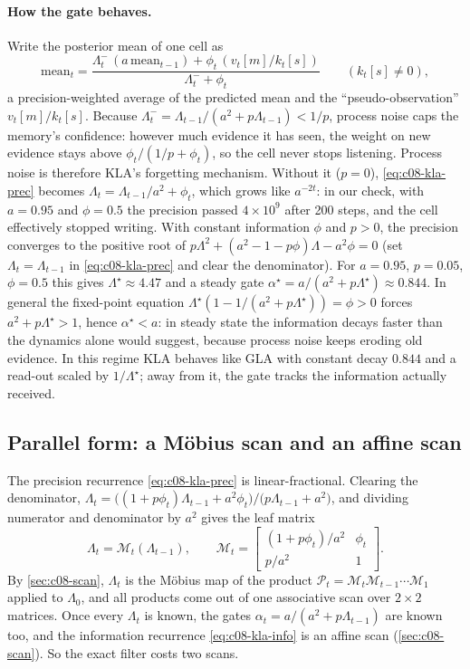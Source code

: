 \paragraph{How the gate behaves.} Write the posterior mean of one cell as
\[
  \text{mean}_t=\frac{\Lambda_t^-\,(a\,\text{mean}_{t-1})+\phi_t\,(v_t[m]/k_t[s])}{\Lambda_t^-+\phi_t}
  \qquad(k_t[s]\neq0),
\]
a precision-weighted average of the predicted mean and the ``pseudo-observation''
$v_t[m]/k_t[s]$. Because $\Lambda_t^-=\Lambda_{t-1}/(a^2+p\Lambda_{t-1})<1/p$, process noise caps
the memory's confidence: however much evidence it has seen, the weight on new evidence stays above
$\phi_t/(1/p+\phi_t)$, so the cell never stops listening. Process noise is therefore KLA's
forgetting mechanism. Without it ($p=0$), \eqref{eq:c08-kla-prec} becomes
$\Lambda_t=\Lambda_{t-1}/a^2+\phi_t$, which grows like $a^{-2t}$: in our check, with $a=0.95$ and
$\phi=0.5$ the precision passed $4\times10^{9}$ after 200 steps, and the cell effectively stopped
writing. With constant information $\phi$ and $p>0$, the precision converges to the positive root
of $p\Lambda^2+(a^2-1-p\phi)\Lambda-a^2\phi=0$ (set $\Lambda_t=\Lambda_{t-1}$ in
\eqref{eq:c08-kla-prec} and clear the denominator). For $a=0.95$, $p=0.05$, $\phi=0.5$ this gives
$\Lambda^\star\approx4.47$ and a steady gate $\alpha^\star=a/(a^2+p\Lambda^\star)\approx0.844$.
In general the fixed-point equation $\Lambda^\star(1-1/(a^2+p\Lambda^\star))=\phi>0$ forces
$a^2+p\Lambda^\star>1$, hence $\alpha^\star<a$: in steady state the information decays faster than
the dynamics alone would suggest, because process noise keeps eroding old evidence. In
this regime KLA behaves like GLA with constant decay $0.844$ and a read-out scaled by
$1/\Lambda^\star$; away from it, the gate tracks the information actually received.

\subsection{Parallel form: a M\"obius scan and an affine scan}\label{sec:c08-kla-scan}

The precision recurrence \eqref{eq:c08-kla-prec} is linear-fractional. Clearing the denominator,
$\Lambda_t=\bigl((1+p\phi_t)\Lambda_{t-1}+a^2\phi_t\bigr)/\bigl(p\Lambda_{t-1}+a^2\bigr)$, and
dividing numerator and denominator by $a^2$ gives the leaf matrix
\begin{equation}\label{eq:c08-kla-leaf}
  \Lambda_t = \mathcal{M}_t(\Lambda_{t-1}),\qquad
  \mathcal{M}_t=\begin{bmatrix}(1+p\phi_t)/a^2 & \phi_t\\ p/a^2 & 1\end{bmatrix}.
\end{equation}
By \cref{sec:c08-scan}, $\Lambda_t$ is the M\"obius map of the product
$\mathcal{P}_t=\mathcal{M}_t\mathcal{M}_{t-1}\cdots\mathcal{M}_1$ applied to $\Lambda_0$, and all
products come out of one associative scan over $2\times2$ matrices. Once every $\Lambda_t$ is known,
the gates $\alpha_t=a/(a^2+p\Lambda_{t-1})$ are known too, and the information recurrence
\eqref{eq:c08-kla-info} is an affine scan (\cref{sec:c08-scan}). So the exact filter costs two scans.

